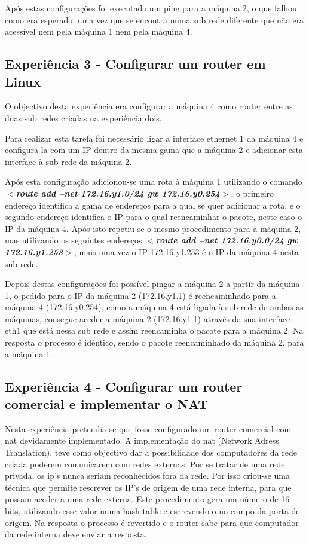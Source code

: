 \documentclass[a4paper]{article}
\begin{document}
Após estas configurações foi executado um ping para a máquina 2, o que falhou como era esperado, uma vez que se encontra numa sub rede diferente que não era acessível nem pela máquina 1 nem pela máquina 4.

\subsection{Experiência 3 - Configurar um router em Linux}
O objectivo desta experiência era configurar a máquina 4 como router entre as duas sub redes criadas na experiência dois.

Para realizar esta tarefa foi necessário ligar a interface ethernet 1 da máquina 4 e configura-la com um IP dentro da mesma gama que a máquina 2 e adicionar esta interface à sub rede da máquina 2.

Após esta configuração adicionou-se uma rota à máquina 1 utilizando o comando \textbf{\textit{$<$route add –net  172.16.y1.0/24 gw 172.16.y0.254$>$}}, o primeiro endereço identifica a gama de endereços para a qual se quer adicionar a rota, e o segundo endereço identifica o IP para o qual reencaminhar o pacote, neste caso o IP da máquina 4. Após isto repetiu-se o mesmo procedimento para a máquina 2, mas utilizando os seguintes endereços \textbf{\textit{$<$route add –net 172.16.y0.0/24 gw 172.16.y1.253$>$}}, mais uma vez o IP 172.16.y1.253 é o IP da máquina 4 nesta sub rede.

Depois destas configurações foi possível pingar a máquina 2 a partir da máquina 1, o pedido para o IP da máquina 2 (172.16.y1.1) é reencaminhado para a máquina 4 (172.16.y0.254), como a máquina 4 está ligada à sub rede de ambas as máquinas, consegue aceder a máquina 2 (172.16.y1.1) através da sua interface eth1 que está nessa sub rede e assim reencaminha o pacote para a máquina 2. Na resposta o processo é idêntico, sendo o pacote reencaminhado da máquina 2, para a máquina 1.



\subsection{Experiência 4 - Configurar um router comercial e implementar o NAT}
Nesta experiência pretendia-se que fosse configurado um router comercial com nat devidamente implementado. A implementação do nat (Network Adress Translation), teve como objectivo dar a possibilidade dos computadores da rede criada poderem comunicarem com redes externas. Por se tratar de uma rede privada, os ip’s nunca seriam reconhecidos fora da rede. Por isso criou-se uma técnica que permite rescrever os IP’s de origem  de uma rede interna, para que possam aceder a uma rede externa. Este procedimento gera um número de 16 bits, utilizando esse valor numa hash table e escrevendo-o no campo da porta de origem. Na resposta o processo é revertido e o router sabe para que computador da rede interna deve enviar a resposta.
\end{document}
